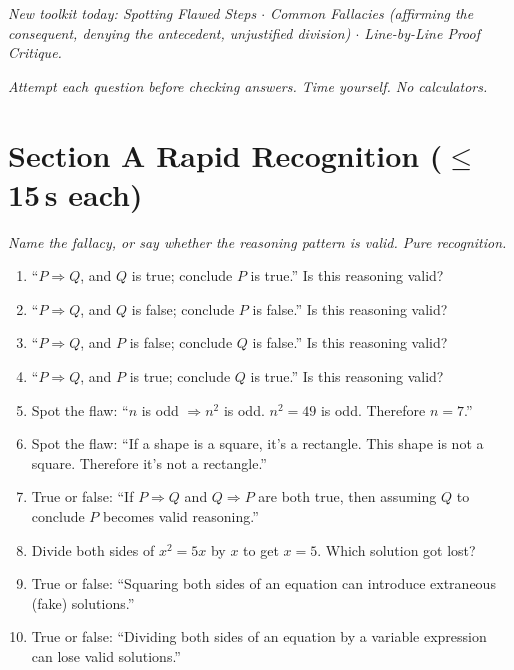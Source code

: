 \documentclass[11pt,a4paper]{article}
\begin{document}
\noindent\textit{New toolkit today: Spotting Flawed Steps $\cdot$ Common Fallacies (affirming the consequent, denying the antecedent, unjustified division) $\cdot$ Line-by-Line Proof Critique.}

\vspace{2pt}
\noindent\textit{Attempt each question before checking answers. Time yourself. No calculators.}

\section*{Section A \quad Rapid Recognition \hfill{\normalfont\small($\leq$15\,s each)}}

\noindent\textit{Name the fallacy, or say whether the reasoning pattern is valid. Pure recognition.}

\begin{enumerate}

\item ``$P\Rightarrow Q$, and $Q$ is true; conclude $P$ is true.'' Is this reasoning valid?

\item ``$P\Rightarrow Q$, and $Q$ is false; conclude $P$ is false.'' Is this reasoning valid?

\item ``$P\Rightarrow Q$, and $P$ is false; conclude $Q$ is false.'' Is this reasoning valid?

\item ``$P\Rightarrow Q$, and $P$ is true; conclude $Q$ is true.'' Is this reasoning valid?

\item Spot the flaw: ``$n$ is odd $\Rightarrow n^2$ is odd. $n^2=49$ is odd. Therefore $n=7$.''

\item Spot the flaw: ``If a shape is a square, it's a rectangle. This shape is not a square. Therefore it's not a rectangle.''

\item True or false: ``If $P\Rightarrow Q$ and $Q\Rightarrow P$ are both true, then assuming $Q$ to conclude $P$ becomes valid reasoning.''

\item Divide both sides of $x^2=5x$ by $x$ to get $x=5$. Which solution got lost?

\item True or false: ``Squaring both sides of an equation can introduce extraneous (fake) solutions.''

\item True or false: ``Dividing both sides of an equation by a variable expression can lose valid solutions.''

\end{enumerate}
\end{document}
